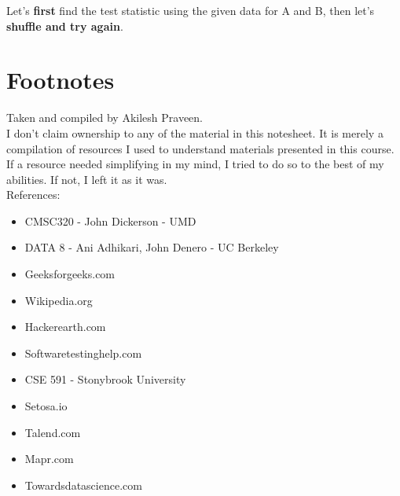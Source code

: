 \documentclass[english, 10pt]{article}
\begin{document}
Let's \textbf{first} find the test statistic using the given data for A and B, then let's \textbf{shuffle and try again}.\\


\section{Footnotes}

Taken and compiled by Akilesh Praveen.\\

I don't claim ownership to any of the material in this notesheet. It is merely a compilation of resources I used to understand materials presented in this course. If a resource needed simplifying in my mind, I tried to do so to the best of my abilities. If not, I left it as it was.\\

References:
\begin{itemize}
	\item CMSC320 - John Dickerson - UMD
	\item DATA 8 - Ani Adhikari, John Denero - UC Berkeley
	\item Geeksforgeeks.com
	\item Wikipedia.org
	\item Hackerearth.com
	\item Softwaretestinghelp.com
	\item CSE 591 - Stonybrook University
	\item Setosa.io
	\item Talend.com
	\item Mapr.com
	\item Towardsdatascience.com
\end{itemize}
\end{document}
